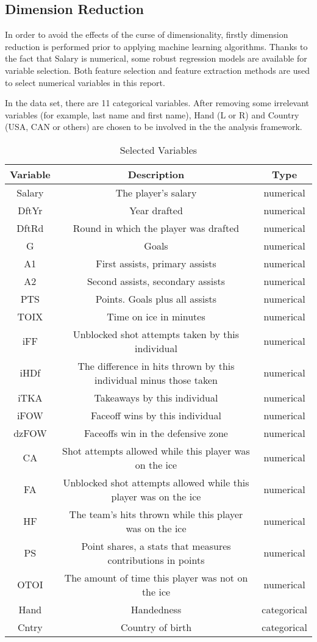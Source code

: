 \subsection{Dimension Reduction}

In order to avoid the effects of the curse of dimensionality, firstly dimension reduction is performed prior to applying machine learning algorithms. Thanks to the fact that Salary is numerical, some robust regression models are available for variable selection. Both feature selection and feature extraction methods are used to select numerical variables in this report. 

In the data set, there are 11 categorical variables. After removing some irrelevant variables (for example, last name and first name), Hand (L or R) and Country (USA, CAN or others) are chosen to be involved in the the analysis framework. 

\begin{table}[h]
	\centering
	\begin{tabular}{c c c}
		Variable & Description & Type \\\hline
		Salary & The player's salary & numerical\\
		DftYr & Year drafted & numerical\\
		DftRd & Round in which the player was drafted & numerical\\
		G & Goals & numerical\\
		A1 & First assists, primary assists & numerical\\
		A2 & Second assists, secondary assists & numerical\\
		PTS & Points. Goals plus all assists & numerical\\
		TOIX & Time on ice in minutes & numerical\\
		iFF & Unblocked shot attempts taken by this individual & numerical\\
		iHDf & The difference in hits thrown by this individual minus those taken & numerical\\
		iTKA  & Takeaways by this individual & numerical\\
		iFOW & Faceoff wins by this individual & numerical\\
		dzFOW & Faceoffs win in the defensive zone & numerical\\
		CA & Shot attempts allowed while this player was on the ice & numerical\\
		FA & Unblocked shot attempts allowed while this player was on the ice & numerical\\
		HF & The team's hits thrown while this player was on the ice & numerical\\
		PS & Point shares, a stats that measures contributions in points & numerical\\
		OTOI & The amount of time this player was not on the ice & numerical\\
		Hand & Handedness & categorical\\
		Cntry & Country of birth & categorical\\
	\end{tabular}
	\caption{\label{tab:widgets}Selected Variables}
\end{table}

